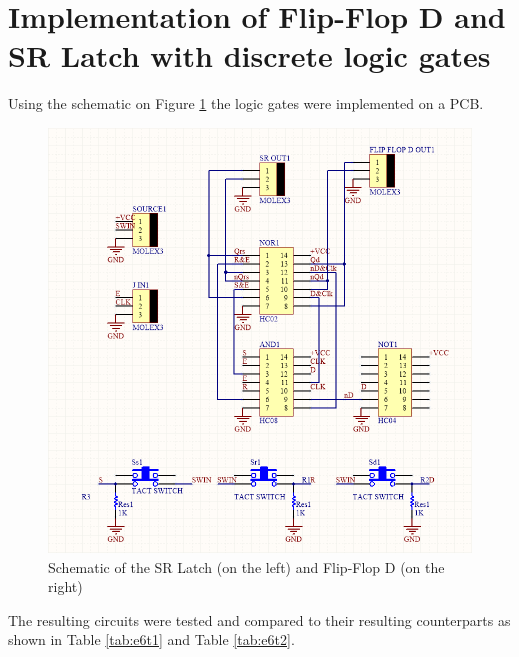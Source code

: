 \documentclass[a4paper]{article}
\begin{document}
        \section{Implementation of Flip-Flop D and SR Latch with discrete logic gates}
        Using the schematic on Figure \ref{fig:Schem} the logic gates were implemented on a PCB.
        
        \begin{figure}[h!]
            \begin{center}
                \includegraphics[width=\linewidth]{e6Schem.png}
                \caption{Schematic of the  SR Latch (on the left) and Flip-Flop D (on the right)}
            \end{center}
            \label{fig:Schem}
        \end{figure}

        The resulting circuits were tested and compared to their resulting counterparts as shown in
        Table \ref{tab:e6t1} and Table \ref{tab:e6t2}.

        \begin{table}[ht]
            \begin{center}
                
                \label{tab:e6t1}
            \end{center}
        \end{table}
        \begin{table}[ht]
            \begin{center}
                
                \label{tab:e6t2}
            \end{center}
        \end{table}
        
\end{document}
